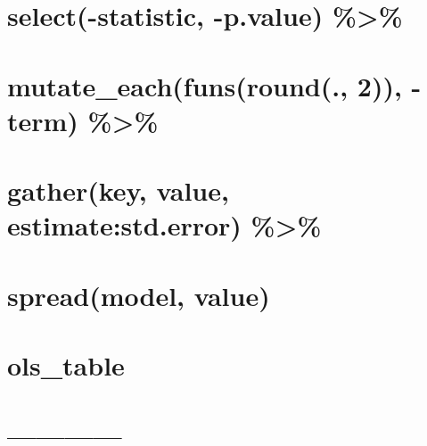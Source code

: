 \documentclass[]{article}
\begin{document}
\hypertarget{select-statistic--p.value}{%
\section{select(-statistic, -p.value)
\%\textgreater{}\%}\label{select-statistic--p.value}}

\hypertarget{mutate_eachfunsround.-2--term}{%
\section{mutate\_each(funs(round(., 2)), -term)
\%\textgreater{}\%}\label{mutate_eachfunsround.-2--term}}

\hypertarget{gatherkey-value-estimatestd.error}{%
\section{gather(key, value, estimate:std.error)
\%\textgreater{}\%}\label{gatherkey-value-estimatestd.error}}

\hypertarget{spreadmodel-value}{%
\section{spread(model, value)}\label{spreadmodel-value}}

\hypertarget{section-8}{%
\section{}\label{section-8}}

\hypertarget{ols_table}{%
\section{ols\_table}\label{ols_table}}

\hypertarget{section-9}{%
\section{}\label{section-9}}

\hypertarget{section-10}{%
\section{}\label{section-10}}

\hypertarget{section-11}{%
\section{------------}\label{section-11}}
\end{document}
